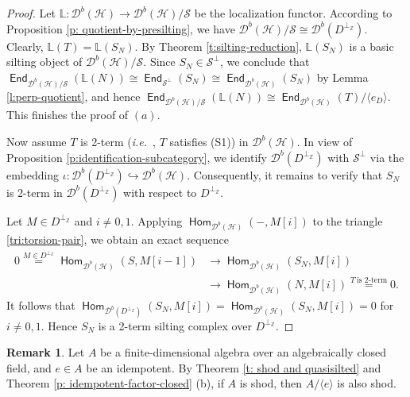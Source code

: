 \documentclass[12pt,a4paper,reqno]{amsart}
\theoremstyle{definition}
\newtheorem{remark}[theorem]{Remark}
\newcommand{\ie}{{\em i.e.}\ }
\newcommand{\opname}[1]{\operatorname{\mathsf{#1}}}
\newcommand{\der}{\cd}
\newcommand{\Hom}{\opname{Hom}}
\newcommand{\End}{\opname{End}}
\newcommand{\cd}{{\mathcal D}}
\begin{document}
\begin{proof}
Let $\mathbb{L}:\der^b(\mathcal{H})\to \der^b(\mathcal{H})/\mathcal{S}$ be the localization functor. According to Proposition \ref{p: quotient-by-presilting}, we have $\der^b(\mathcal{H})/\mathcal{S}\cong \der^b(D^{\perp_\mathbb{Z}})$.  Clearly, $\mathbb{L}(T)=\mathbb{L}(S_N)$. By Theorem \ref{t:silting-reduction}, $\mathbb{L}(S_N)$ is a basic silting object of $\der^b(\mathcal{H})/\mathcal{S}$. 
Since $S_N\in \mathcal{S}^\perp$, we conclude that $\End_{\der^b(\mathcal{H})/\mathcal{S}}(\mathbb{L}(N))\cong \End_{\mathcal{S}^{\perp}}(S_N)\cong \End_{\der^b(\mathcal{H})}(S_N)$ by Lemma \ref{l:perp-quotient}, and hence  $\End_{\der^b(\mathcal{H})/\mathcal{S}}(\mathbb{L}(N))\cong \End_{\der^b(\mathcal{H})} (T) / \langle e_D \rangle$.
This finishes the proof of $(a)$.



 Now assume $T$ is 2-term (\ie, $T$ satisfies (S1)) in $\der^b(\mathcal{H})$.
In view of  Proposition \ref{p:identification-subcategory}, we identify  $\der^b(D^{\perp_\mathbb{Z}})$ with $\mathcal{S}^\perp$ via the embedding $\iota:\der^b(D^{\perp_{\mathbb{Z}}})\hookrightarrow \der^b(\mathcal{H})$. Consequently, it remains to verify that $S_N$ is 2-term in $\der^b(D^{\perp_{\mathbb{Z}}})$ with respect to $D^{\perp_{\mathbb{Z}}}$.


Let $M \in D^{\perp_{\mathbb{Z}}}$ and $i \neq 0, 1$. Applying $\Hom_{\der^b(\mathcal{H})} (-, M[i])$ to the triangle \eqref{tri:torsion-pair}, we obtain an exact sequence
\begin{align*}
0 \overset{M \in D^{\perp_{\mathbb{Z}}}}{=} \Hom_{\der^b(\mathcal{H})} (S, M[i - 1]) &\to \Hom_{\der^b(\mathcal{H})} (S_N, M[i])\\
 &\to \Hom_{\der^b(\mathcal{H})} (N, M[i]) \overset{T~\text{is 2-term}}{=} 0.
\end{align*}
It follows that $\Hom_{\der^b(D^{\perp_\mathbb{Z}})} (S_N, M[i])=\Hom_{\der^b(\mathcal{H})} (S_N, M[i])=0$ for $i\neq 0,1$. Hence $S_N$ is a 2-term silting complex over $D^{\perp_\mathbb{Z}}$.
\end{proof}

\begin{remark} \label{r: shod is idem-quotient closed} Let $A$ be a finite-dimensional algebra over an algebraically closed field, and $e\in A$ be an idempotent. By Theorem \ref{t: shod and quasisilted} and Theorem \ref{p: idempotent-factor-closed}  (b), if $A$ is shod, then $A / \langle e \rangle$ is also shod.
\end{remark}


\end{document}

